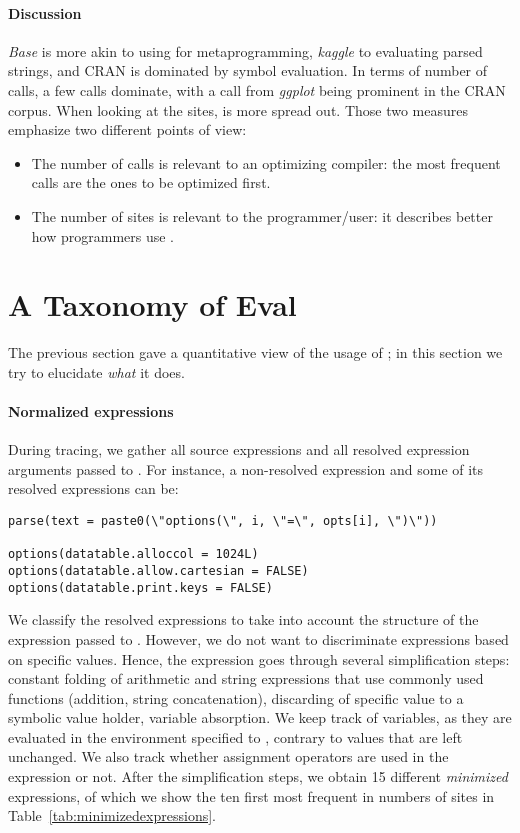 \documentclass[acmsmall]{acmart}
\begin{document}
\paragraph{Discussion} \emph{Base} is more akin to using \eval for metaprogramming, \emph{kaggle} to evaluating parsed strings, and CRAN is dominated by symbol evaluation. In terms of number of calls, a few calls dominate, with a call from \emph{ggplot} being prominent in the CRAN corpus. When looking at the \eval sites, \eval is more spread out. Those two measures emphasize two different points of view:

\begin{itemize}
	\item The number of calls is relevant to an optimizing compiler: the most frequent calls are the ones to be optimized first.
	\item The number of sites is relevant to the programmer/user: it describes better how programmers use \eval.
\end{itemize}



\section{A Taxonomy of Eval}

The previous section gave a quantitative view of the usage of \eval;
in this section we try to elucidate \emph{what} it does.

\paragraph{Normalized expressions} During tracing, we gather all source expressions and all resolved expression arguments passed to \eval. For instance, a non-resolved expression and some of its resolved expressions can be:

\begin{lstlisting}
parse(text = paste0(\"options(\", i, \"=\", opts[i], \")\"))

options(datatable.alloccol = 1024L)
options(datatable.allow.cartesian = FALSE)
options(datatable.print.keys = FALSE)
\end{lstlisting}

We classify the resolved expressions to take into account the structure of the expression passed to \eval.
However, we do not want to discriminate expressions based on specific values. Hence, the expression goes through several simplification steps: constant folding of arithmetic and string expressions that use commonly used functions (addition, string concatenation), discarding of specific value to a symbolic value holder, variable absorption. We keep track of variables, as they are evaluated in the environment specified to \eval, contrary to values that are left unchanged. We also track whether assignment operators are used in the expression or not. After the simplification steps, we obtain 15 different \emph{minimized} expressions, of which we show the ten first most frequent in numbers of sites in Table~\ref{tab:minimizedexpressions}.
\end{document}
